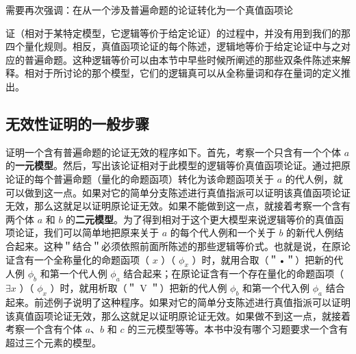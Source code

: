 需要再次强调：在从一个涉及普遍命题的论证转化为一个真值函项论

证（相对于某特定模型，它逻辑等价于给定论证）的过程中，并没有用到我们的那四个量化规则。相反，真值函项论证的每个陈述，逻辑地等价于给定论证中与之对应的普遍命题。这种逻辑等价可以由本节中早些时候所阐述的那些双条件陈述来解释。相对于所讨论的那个模型，它们的逻辑真可以从全称量词和存在量词的定义推出。

\subsection{无效性证明的一般步骤}

证明一个含有普遍命题的论证无效的程序如下。首先，考察一个只含有一个个体 $a$ 的\textbf{一元模型}。然后，写出该论证相对于此模型的逻辑等价真值函项论证。通过把原论证的每个普遍命题（量化的命题函项）转化为该命题函项关于 $a$ 的代人例，就可以做到这一点。如果对它的简单分支陈述进行真值指派可以证明该真值函项论证无效，那么这就足以证明原论证无效。如果不能做到这一点，就接着考察一个含有两个体 $a$ 和 $b$ 的\textbf{二元模型}。为了得到相对于这个更大模型来说逻辑等价的真值函项论证，我们可以简单地把原来关于 $a$ 的每个代人例和一个关于 $b$ 的新代人例结合起来。这种＂结合＂必须依照前面所陈述的那些逻辑等价式。也就是说，在原论证含有一个全称量化的命题函项（ $x$ ）（ $\phi_{x}$ ）时，就用合取（＂•＂）把新的代人例 $\phi_{b}$ 和第一个代人例 $\phi_{a}$ 结合起来；在原论证含有一个存在量化的命题函项（ $\exists x$ ）（ $\phi_{x}$ ）时，就用析取（＂ V ＂）把新的代人例 $\phi_{b}$ 和第一个代入例 $\phi_{a}$ 结合起来。前述例子说明了这种程序。如果对它的简单分支陈述进行真值指派可以证明该真值函项论证无效，那么这就足以证明原论证无效。如果做不到这一点，就接着考察一个含有个体 $a 、 b$ 和 $c$ 的三元模型等等。本书中没有哪个习题要求一个含有超过三个元素的模型。 

